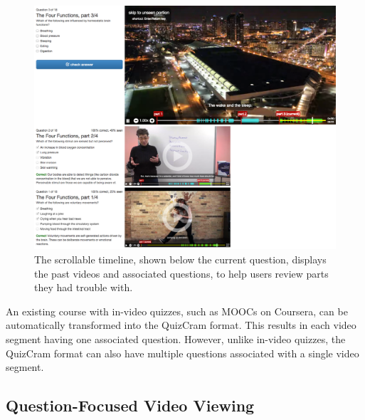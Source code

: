 \documentclass{chi-ext}
\begin{document}
\begin{figure}
\centering
\includegraphics[width=1.0\columnwidth]{quizcram-and-timeline2}
\caption{The scrollable timeline, shown below the current question, displays the past videos and associated questions, to help users review parts they had trouble with.}
\label{fig:figure3}
\end{figure}

An existing course with in-video quizzes, such as MOOCs on Coursera, can be automatically transformed into the QuizCram format. This results in each video segment having one associated question. However, unlike in-video quizzes, the QuizCram format can also have multiple questions associated with a single video segment.

\subsection{Question-Focused Video Viewing}
\end{document}
